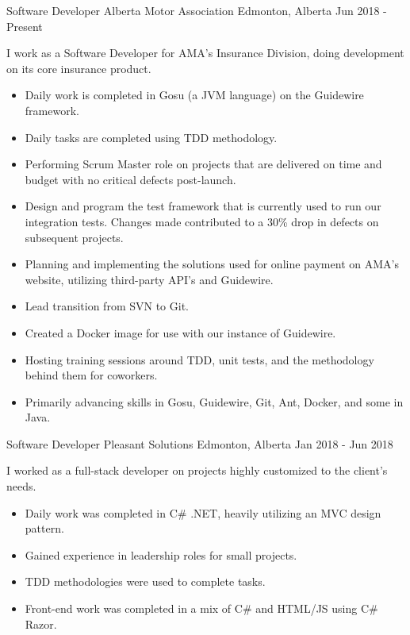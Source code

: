 
\begin{cventries}
    \cventry
        {Software Developer}
        {Alberta Motor Association}
        {Edmonton, Alberta}
        {Jun 2018 - Present}
        {
            I work as a Software Developer for AMA’s Insurance Division, doing development on its core insurance product.
            \begin{itemize}
                \item Daily work is completed in Gosu (a JVM language) on the Guidewire framework.
                \item Daily tasks are completed using TDD methodology.
                \item Performing Scrum Master role on projects that are delivered on time and budget with no critical defects post-launch.
                \item Design and program the test framework that is currently used to run our integration tests. Changes made contributed to a 30\% drop in defects on subsequent projects.
                \item Planning and implementing the solutions used for online payment on AMA’s website, utilizing third-party API’s and Guidewire.
                \item Lead transition from SVN to Git.
                \item Created a Docker image for use with our instance of Guidewire.
                \item Hosting training sessions around TDD, unit tests, and the methodology behind them for coworkers.
                \item Primarily advancing skills in Gosu, Guidewire, Git, Ant, Docker, and some in Java.
            \end{itemize}
        }
    \cventry
        {Software Developer}
        {Pleasant Solutions}
        {Edmonton, Alberta}
        {Jan 2018 - Jun 2018}
        {
            I worked as a full-stack developer on projects highly customized to the client’s needs.
            \begin{itemize}
                \item Daily work was completed in C\# .NET, heavily utilizing an MVC design pattern.
                \item Gained experience in leadership roles for small projects.
                \item TDD methodologies were used to complete tasks.
                \item Front-end work was completed in a mix of C\# and HTML/JS using C\# Razor.

\end{itemize}}
\end{cventries}
